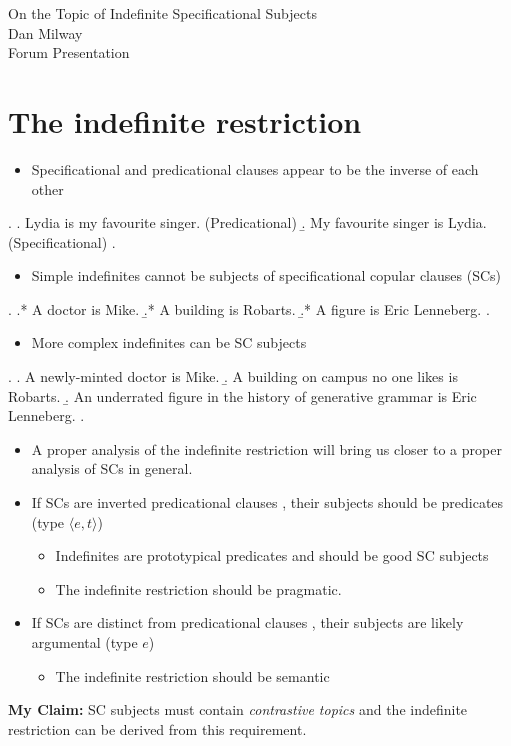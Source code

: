 \documentclass[letterpaper]{article}
\begin{document}
\begin{center}
  {\Large On the Topic of Indefinite Specificational Subjects\\}
  {\large Dan Milway}\\
  Forum Presentation
\end{center}
\section{The indefinite restriction}
\begin{itemize}
  \item Specificational and predicational clauses appear to be the inverse of each other
\end{itemize}
\ex.
\a. Lydia is my favourite singer. (Predicational)
\b. My favourite singer is Lydia. (Specificational)
\z.

\begin{itemize}
  \item Simple indefinites cannot be subjects of specificational copular clauses (SCs)
\end{itemize}
\ex.\label{ex:BadSCs}
\a.* A doctor is Mike.
\b.* A building is Robarts.
\b.* A figure is Eric Lenneberg.
\z.

\begin{itemize}
  \item More complex indefinites can be SC subjects
\end{itemize}
\ex.\label{ex:GoodSCs}
\a. A newly-minted doctor is Mike.
\b. A building on campus no one likes is Robarts.
\b. An underrated figure in the history of generative grammar is Eric Lenneberg.
\z.

\begin{itemize}
  \item A proper analysis of the indefinite restriction will bring us closer to a proper analysis of SCs in general.
  \item If SCs are inverted predicational clauses \parencite{moro1997raising,mikkelsen2004specifying}, their subjects should be predicates (type $\langle e,t\rangle$)
    \begin{itemize}
      \item Indefinites are prototypical predicates and should be good SC subjects
      \item The indefinite restriction should be pragmatic.
    \end{itemize}
  \item If SCs are distinct from predicational clauses \parencite{heycockkroch1999pseudocleft,heycock2012specification}, their subjects are likely argumental (type $e$)
    \begin{itemize}
      \item The indefinite restriction should be semantic
    \end{itemize}
\end{itemize}
\textbf{My Claim:} SC subjects must contain \textit{contrastive topics} and the indefinite restriction can be derived from this requirement.
\end{document}
